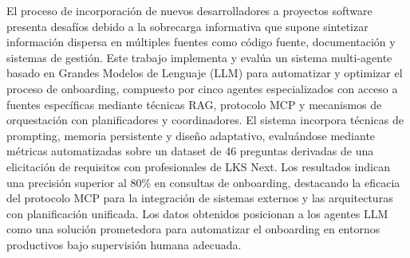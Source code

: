 El proceso de incorporación de nuevos desarrolladores a proyectos software presenta desafíos debido a la sobrecarga informativa que supone sintetizar información dispersa en múltiples fuentes como código fuente, documentación y sistemas de gestión. Este trabajo implementa y evalúa un sistema multi-agente basado en Grandes Modelos de Lenguaje (LLM) para automatizar y optimizar el proceso de onboarding, compuesto por cinco agentes especializados con acceso a fuentes específicas mediante técnicas RAG, protocolo MCP y mecanismos de orquestación con planificadores y coordinadores. El sistema incorpora técnicas de prompting, memoria persistente y diseño adaptativo, evaluándose mediante métricas automatizadas sobre un dataset de 46 preguntas derivadas de una elicitación de requisitos con profesionales de LKS Next. Los resultados indican una precisión superior al 80\% en consultas de onboarding, destacando la eficacia del protocolo MCP para la integración de sistemas externos y las arquitecturas con planificación unificada. Los datos obtenidos posicionan a los agentes LLM como una solución prometedora para automatizar el onboarding en entornos productivos bajo supervisión humana adecuada.

